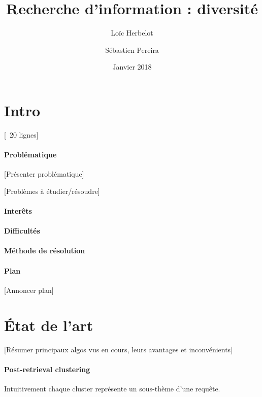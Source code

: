 \documentclass{article}
\title{Recherche d'information : diversité}
\date{Janvier 2018}
\author{
   Loïc Herbelot
   \and
   Sébastien Pereira
  }
\begin{document}
\maketitle 


\tableofcontents{}


\begin{multicols}{2}

\section{Intro}
[~20 lignes]
\paragraph{Problématique}

[Présenter problématique]

[Problèmes à étudier/résoudre]

\paragraph{Interêts}

\paragraph{Difficultés}

\paragraph{Méthode de résolution}

\paragraph{Plan}
[Annoncer plan]

\section{État de l'art}
[Résumer principaux algos vus en cours, leurs avantages et inconvénients]
\paragraph{Post-retrieval clustering}
Intuitivement chaque cluster représente un sous-thème d'une requête.


\end{multicols}
\end{document}
